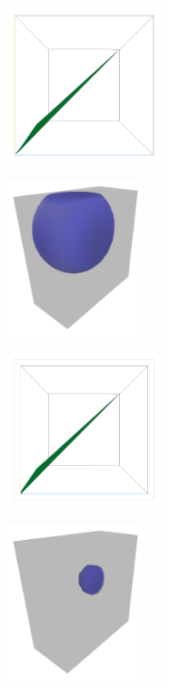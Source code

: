 \documentclass[a4paper,fontsize=12pt,toc=bib,halfparskip]{scrartcl}
\begin{document}
\begin{figure}
	\begin{subfigure}{0.49\textwidth}
		\centering
		\includegraphics[height=4.5cm]{pictures/results/SinglePoint/SinglePoint_InvariantSpace1.png}
		\subcaption{}
		\label{SinglePointInvariant1}
	\end{subfigure}
	\hspace*{\fill}
	\begin{subfigure}{0.49\textwidth}
		\centering
		\includegraphics[height=4.5cm]{pictures/results/SinglePoint/SinglePoint_Object1.png}
		\subcaption{}
		\label{SinglePointObject1}
	\end{subfigure}
	\medskip
	\begin{subfigure}{0.49\textwidth}
		\centering
		\includegraphics[height=4.5cm]{pictures/results/SinglePoint/SinglePoint_InvariantSpace2.png}
		\subcaption{}
		\label{SinglePointInvariant2}
	\end{subfigure}
	\hspace*{\fill}
	\begin{subfigure}{0.49\textwidth}
		\centering
		\includegraphics[height=4.5cm]{pictures/results/SinglePoint/SinglePoint_Object2.png}

\end{subfigure}
\end{figure}
\end{document}
